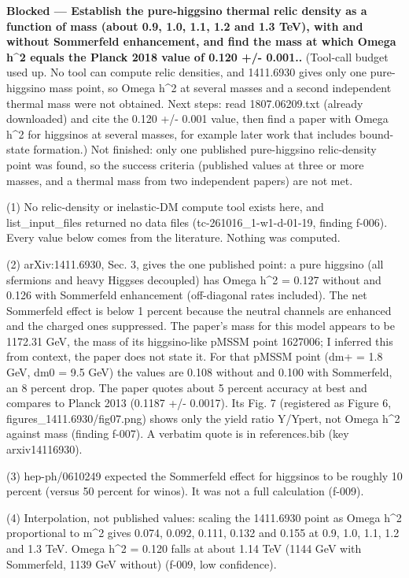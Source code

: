 \documentclass[11pt,a4paper]{article}
\begin{document}
\textbf{Blocked --- Establish the pure-higgsino thermal relic density as a function of mass (about 0.9, 1.0, 1.1, 1.2 and 1.3 TeV), with and without Sommerfeld enhancement, and find the mass at which Omega h\textasciicircum{}2 equals the Planck 2018 value of 0.120 +/- 0.001..} (Tool-call budget used up. No tool can compute relic densities, and 1411.6930 gives only one pure-higgsino mass point, so Omega h\textasciicircum{}2 at several masses and a second independent thermal mass were not obtained. Next steps: read 1807.06209.txt (already downloaded) and cite the 0.120 +/- 0.001 value, then find a paper with Omega h\textasciicircum{}2 for higgsinos at several masses, for example later work that includes bound-state formation.) Not finished: only one published pure-higgsino relic-density point was found, so the success criteria (published values at three or more masses, and a thermal mass from two independent papers) are not met.

(1) No relic-density or inelastic-DM compute tool exists here, and list\_input\_files returned no data files (tc-261016\_1-w1-d-01-19, finding f-006). Every value below comes from the literature. Nothing was computed.

(2) arXiv:1411.6930, Sec. 3, gives the one published point: a pure higgsino (all sfermions and heavy Higgses decoupled) has Omega h\textasciicircum{}2 = 0.127 without and 0.126 with Sommerfeld enhancement (off-diagonal rates included). The net Sommerfeld effect is below 1 percent because the neutral channels are enhanced and the charged ones suppressed. The paper's mass for this model appears to be 1172.31 GeV, the mass of its higgsino-like pMSSM point 1627006; I inferred this from context, the paper does not state it. For that pMSSM point (dm+ = 1.8 GeV, dm0 = 9.5 GeV) the values are 0.108 without and 0.100 with Sommerfeld, an 8 percent drop. The paper quotes about 5 percent accuracy at best and compares to Planck 2013 (0.1187 +/- 0.0017). Its Fig. 7 (registered as Figure 6, figures\_1411.6930/fig07.png) shows only the yield ratio Y/Ypert, not Omega h\textasciicircum{}2 against mass (finding f-007). A verbatim quote is in references.bib (key arxiv14116930).

(3) hep-ph/0610249 expected the Sommerfeld effect for higgsinos to be roughly 10 percent (versus 50 percent for winos). It was not a full calculation (f-009).

(4) Interpolation, not published values: scaling the 1411.6930 point as Omega h\textasciicircum{}2 proportional to m\textasciicircum{}2 gives 0.074, 0.092, 0.111, 0.132 and 0.155 at 0.9, 1.0, 1.1, 1.2 and 1.3 TeV. Omega h\textasciicircum{}2 = 0.120 falls at about 1.14 TeV (1144 GeV with Sommerfeld, 1139 GeV without) (f-009, low confidence).
\end{document}
